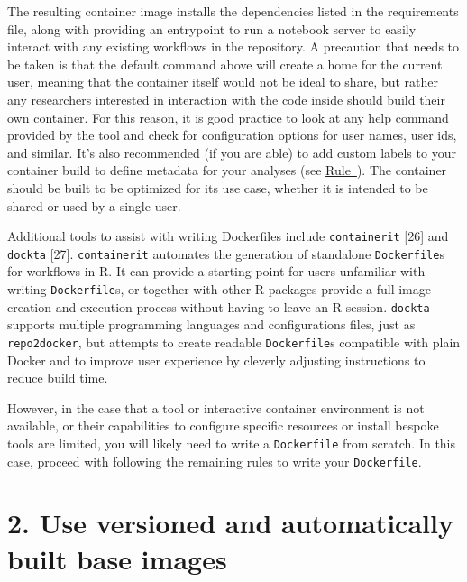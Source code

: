 \documentclass[10pt,letterpaper]{article}
\begin{document}
The resulting container image installs the dependencies listed in the
requirements file, along with providing an entrypoint to run a notebook
server to easily interact with any existing workflows in the repository.
A precaution that needs to be taken is that the default command above
will create a home for the current user, meaning that the container
itself would not be ideal to share, but rather any researchers
interested in interaction with the code inside should build their own
container. For this reason, it is good practice to look at any help
command provided by the tool and check for configuration options for
user names, user ids, and similar. It's also recommended (if you are
able) to add custom labels to your container build to define metadata
for your analyses (see
\hyperref[{rule:metadata}]{Rule~}). The
container should be built to be optimized for its use case, whether it
is intended to be shared or used by a single user.

Additional tools to assist with writing Dockerfiles include
\texttt{containerit} {[}26{]} and \texttt{dockta} {[}27{]}.
\texttt{containerit} automates the generation of standalone
\texttt{Dockerfile}s for workflows in R. It can provide a starting point
for users unfamiliar with writing \texttt{Dockerfile}s, or together with
other R packages provide a full image creation and execution process
without having to leave an R session. \texttt{dockta} supports multiple
programming languages and configurations files, just as
\texttt{repo2docker}, but attempts to create readable
\texttt{Dockerfile}s compatible with plain Docker and to improve user
experience by cleverly adjusting instructions to reduce build time.

However, in the case that a tool or interactive container environment is
not available, or their capabilities to configure specific resources or
install bespoke tools are limited, you will likely need to write a
\texttt{Dockerfile} from scratch. In this case, proceed with following
the remaining rules to write your \texttt{Dockerfile}.

\hypertarget{use-versioned-and-automatically-built-base-images}{%
\section*{2. Use versioned and automatically built base
images}\label{use-versioned-and-automatically-built-base-images}}
\end{document}
